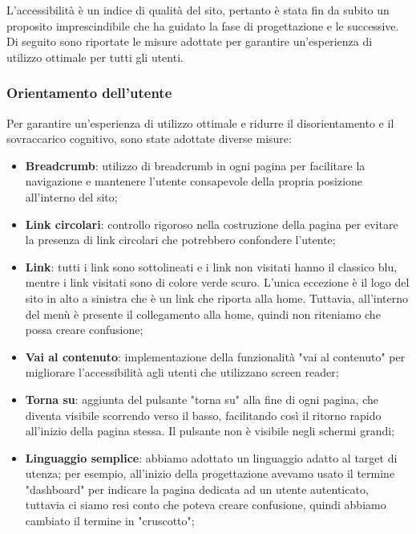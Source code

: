 L'accessibilità è un indice di qualità del sito, pertanto è stata fin da subito
un proposito imprescindibile che ha guidato la fase di progettazione e le
successive. Di seguito sono riportate le misure adottate per garantire
un'esperienza di utilizzo ottimale per tutti gli utenti.

\subsubsection{Orientamento dell'utente}

Per garantire un'esperienza di utilizzo ottimale e ridurre il disorientamento e
il sovraccarico cognitivo, sono state adottate diverse misure:

\begin{itemize}
	\item \textbf{Breadcrumb}: utilizzo di breadcrumb in ogni pagina per
	      facilitare la navigazione e mantenere l'utente consapevole della
	      propria posizione all'interno del sito;

	\item \textbf{Link circolari}: controllo rigoroso nella costruzione della
	      pagina per evitare la presenza di link circolari che potrebbero
	      confondere l'utente;

	\item \textbf{Link}: tutti i link sono sottolineati e i link non visitati
	      hanno il classico blu, mentre i link visitati sono di colore verde
	      scuro. L'unica eccezione è il logo del sito in alto a sinistra
	      che è un link che riporta alla home. Tuttavia, all'interno del menù è
	      presente il collegamento alla home, quindi non riteniamo che possa
	      creare confusione;

	\item \textbf{Vai al contenuto}: implementazione della funzionalità "vai al
	      contenuto" per migliorare l'accessibilità agli utenti che utilizzano
	      screen reader;

	\item \textbf{Torna su}: aggiunta del pulsante "torna su" alla fine di
	      ogni pagina, che diventa visibile scorrendo verso il basso,
	      facilitando così il ritorno rapido all'inizio della pagina stessa.
	      Il pulsante non è visibile negli schermi grandi;

	\item \textbf{Linguaggio semplice}: abbiamo adottato un linguaggio adatto al
	      target di utenza; per esempio, all'inizio della progettazione avevamo usato il termine
	      "dashboard" per indicare la pagina dedicata ad un utente autenticato, tuttavia
	      ci siamo resi conto che poteva creare confusione, quindi abbiamo
	      cambiato il termine in "cruscotto";


\end{itemize}
